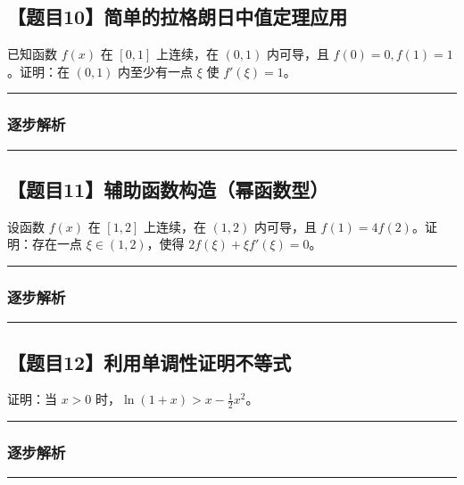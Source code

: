 \documentclass[UTF8]{ctexart}
\newenvironment{redenv}{\color{red}}{}
\newcommand{\problemrule}{\noindent\rule{\textwidth}{1.5pt}\vspace{-0.8em}}
\newcommand{\analysisrule}{\noindent\rule{\textwidth}{0.8pt}\vspace{-0.8em}}
\begin{document}
\subsection*{【题目10】简单的拉格朗日中值定理应用}
已知函数 $f(x)$ 在 $[0, 1]$ 上连续，在 $(0, 1)$ 内可导，且 $f(0)=0, f(1)=1$。证明：在 $(0, 1)$ 内至少有一点 $\xi$ 使 $f'(\xi)=1$。

\begin{redenv}
\analysisrule
\subsubsection*{逐步解析}
\vspace{6cm} %
\end{redenv}

\vspace{2em}
\problemrule
\subsection*{【题目11】辅助函数构造（幂函数型）}
设函数 $f(x)$ 在 $[1, 2]$ 上连续，在 $(1, 2)$ 内可导，且 $f(1) = 4f(2)$。证明：存在一点 $\xi \in (1, 2)$，使得 $2f(\xi) + \xi f'(\xi) = 0$。

\begin{redenv}
\analysisrule
\subsubsection*{逐步解析}
\vspace{6cm} %
\end{redenv}

\vspace{2em}
\problemrule
\subsection*{【题目12】利用单调性证明不等式}
证明：当 $x > 0$ 时，$\ln(1+x) > x - \frac{1}{2}x^2$。

\begin{redenv}
\analysisrule
\subsubsection*{逐步解析}
\vspace{8cm} %
\end{redenv}

\vspace{2em}
\problemrule
\end{document}
